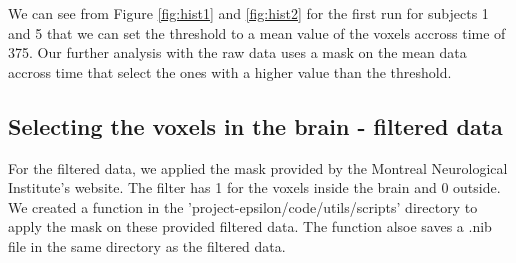 \par We can see from Figure \ref{fig:hist1} and \ref{fig:hist2} for the first run for
subjects 1 and 5 that we can set the threshold to a mean value of the voxels accross
time of 375. Our further analysis with the raw data uses a mask on the mean data accross
time that select the ones with a higher value than the threshold.

\subsection{Selecting the voxels in the brain - filtered data}

\par For the filtered data, we applied the mask provided by the Montreal Neurological 
Institute's website. The filter has 1 for the voxels inside the brain and 0 outside.
We created a function in the 'project-epsilon/code/utils/scripts' directory to 
apply the mask on these provided filtered data. The function alsoe saves a .nib file in
the same directory as the filtered data.

